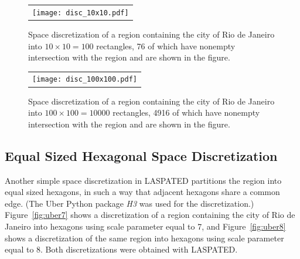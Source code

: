 \documentclass[article]{jss}
\newcommand{\ignore}[1]{}
\begin{document}
\begin{figure}
\centering
\begin{tabular}{c}
\texttt{[image: disc\_10x10.pdf]}
\end{tabular}
\caption{\label{figurerect1010}
Space discretization of a region containing the city of Rio de Janeiro into $10 \times 10 = 100$ rectangles, 76 of which have nonempty intersection with the region and are shown in the figure.}
\end{figure}


\begin{figure}
\centering
\begin{tabular}{c}
\texttt{[image: disc\_100x100.pdf]}
\end{tabular}
\caption{\label{figurerect100100}
Space discretization of a region containing the city of Rio de Janeiro into $100 \times 100 = 10000$ rectangles, 4916 of which have nonempty intersection with the region and are shown in the figure.}
\end{figure}


\subsection{Equal Sized Hexagonal Space Discretization}

Another simple space discretization in LASPATED partitions the region into equal sized hexagons, in such a way that adjacent hexagons share a common edge.
(The Uber Python package \textit{H3} was used for the discretization.)
Figure~\ref{fig:uber7} shows a discretization of a region containing the city of Rio de Janeiro into hexagons using scale parameter equal to 7, and Figure~\ref{fig:uber8} shows a discretization of the same region into hexagons using scale parameter equal to 8.
Both discretizations were obtained with LASPATED.

\ignore{
LASPATED also provides an hexagonal discretization of the studied area.
This discretization is again obtained with LASPATED method {\textbf{add\_geo\_discretization}} now specifying 'H' for parameter \textbf{discr\_type} and an additional scale integer parameter \textbf{hex\_discr\_param} taking values between one and 16, where the smaller the integer the coarser the discretization.

\begin{lstlisting}[label={list:7},caption=Hexagonal discretization.]

# Hexagonal discretization with scale parameter 7
# The corresponding discretization for Rio de Janeiro city is given in  Figure 3
app.add_geo_discretization(
    discr_type='H',
    hex_discr_param=7
)

import matplotlib as plt
app.geo_discretization.boundary.plot()
plt.show()

# Hexagonal discretization with scale parameter 8
# The corresponding discretization for Rio de Janeiro city is given in  Figure 4
app.add_geo_discretization(
    discr_type='H',
    hex_discr_param=8
)

# Plotting the regions
app.geo_discretization.boundary.plot()
plt.show()
\end{lstlisting}
}
\end{document}
